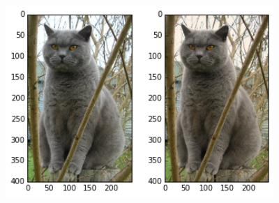\begin{frame}

  \begin{figure}[htbp]
    \centering
    \includegraphics[width=4in]{images/cat_tinted_imshow.png}
  \end{figure}
\end{frame}